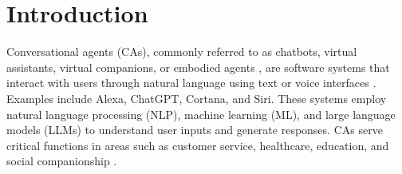 \documentclass[manuscript,anonymous,sigconf]{acmart}
\begin{document}



\maketitle

\section{Introduction}
\label{sec:introduction}

Conversational agents (CAs), commonly referred to as chatbots, virtual assistants, virtual companions, or embodied agents \citep{klein_effects_2025}, are software systems that interact with users through natural language using text or voice interfaces \citep{diederich_conversational_2019}. Examples include Alexa, ChatGPT, Cortana, and Siri. These systems employ natural language processing (NLP), machine learning (ML), and large language models (LLMs) to understand user inputs and generate responses. CAs serve critical functions in areas such as customer service, healthcare, education, and social companionship \citep{araujo2018living,brandtzaeg2017people}.
\end{document}
